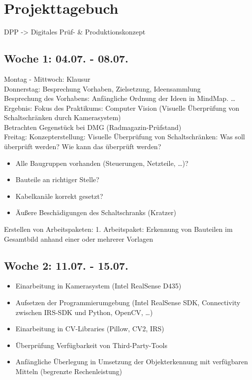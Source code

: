 \chapter{Projekttagebuch}\label{ch:projekttagebuch}
DPP -> Digitales Prüf- \& Produktionskonzept
\section*{Woche 1: 04.07. - 08.07.}
Montag - Mittwoch: Klausur\\
Donnerstag: Besprechung Vorhaben, Zielsetzung, Ideensammlung\\
Besprechung des Vorhabens: Anfängliche Ordnung der Ideen in MindMap.  \ldots\\
Ergebnis: Fokus des Praktikums: Computer Vision (Visuelle Überprüfung von Schaltschränken durch Kamerasystem)\\
Betrachten Gegenstück bei DMG (Radmagazin-Prüfstand) \\
Freitag: Konzepterstellung: Visuelle Überprüfung von Schaltschränken: Was soll überprüft werden?
Wie kann das überprüft werden?
\begin{itemize}
    \item Alle Baugruppen vorhanden (\zB Steuerungen, Netzteile, \ldots)?
    \item Bauteile an richtiger Stelle?
    \item Kabelkanäle korrekt gesetzt?
    \item Äußere Beschädigungen des Schaltschranks (\zB Kratzer)
\end{itemize}
Erstellen von Arbeitspaketen: 1. Arbeitspaket: Erkennung von Bauteilen im Gesamtbild anhand einer oder mehrerer Vorlagen

\section*{Woche 2: 11.07. - 15.07.}
\begin{itemize}
    \item Einarbeitung in Kamerasystem (Intel RealSense D435)
    \item Aufsetzen der Programmierumgebung (Intel RealSense SDK, Connectivity zwischen IRS-SDK und Python, OpenCV, \ldots)
    \item Einarbeitung in CV-Libraries (Pillow, CV2, IRS)
    \item Überprüfung Verfügbarkeit von Third-Party-Tools
    \item Anfängliche Überlegung in Umsetzung der Objekterkennung mit verfügbaren Mitteln (begrenzte Rechenleistung)
\end{itemize}
